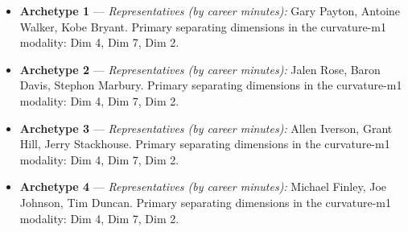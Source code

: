 \begin{itemize}
\item \textbf{Archetype 1} --- \emph{Representatives (by career minutes):} Gary Payton, Antoine Walker, Kobe Bryant. Primary separating dimensions in the curvature-m1 modality: Dim 4, Dim 7, Dim 2.
\item \textbf{Archetype 2} --- \emph{Representatives (by career minutes):} Jalen Rose, Baron Davis, Stephon Marbury. Primary separating dimensions in the curvature-m1 modality: Dim 4, Dim 7, Dim 2.
\item \textbf{Archetype 3} --- \emph{Representatives (by career minutes):} Allen Iverson, Grant Hill, Jerry Stackhouse. Primary separating dimensions in the curvature-m1 modality: Dim 4, Dim 7, Dim 2.
\item \textbf{Archetype 4} --- \emph{Representatives (by career minutes):} Michael Finley, Joe Johnson, Tim Duncan. Primary separating dimensions in the curvature-m1 modality: Dim 4, Dim 7, Dim 2.
\end{itemize}
